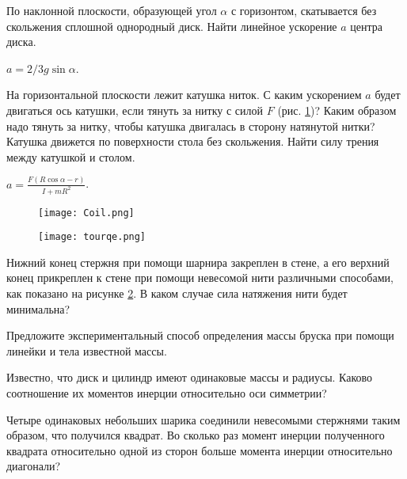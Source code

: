 \begin{ex} %
По наклонной плоскости, образующей угол $\alpha$ с горизонтом, скатывается без скольжения сплошной однородный диск. Найти линейное ускорение $a$ центра диска.
\begin{ans}
$a=2/3g\sin \alpha$.
\end{ans}
\end{ex}	

\begin{ex} %
На горизонтальной плоскости лежит катушка ниток. С каким ускорением $a$ будет двигаться ось катушки, если тянуть за нитку с силой $F$ (рис. \ref{Coil})? Каким образом	надо тянуть за нитку, чтобы катушка двигалась в сторону натянутой нитки? Катушка движется по поверхности стола без скольжения. Найти силу трения между катушкой и столом.
\begin{ans}
$a = \frac{F(R\cos \alpha - r)}{I + mR^2}$.
\end{ans}
\end{ex}	

\begin{figure}
\centering
\texttt{[image: Coil.png]}
\caption{}
\label{Coil}
\end{figure}

\qualProblems

\begin{figure}[h]
\centering
\texttt{[image: tourqe.png]}
\caption{}
\label{tourqe}
\end{figure}

\begin{ex}
Нижний конец стержня при помощи шарнира закреплен в стене, а его верхний конец прикреплен к стене при помощи невесомой нити различными способами, как показано на рисунке \ref{tourqe}. В каком случае сила натяжения нити будет минимальна?
\end{ex}	

\begin{ex}
Предложите экспериментальный способ определения массы бруска при помощи линейки и тела известной массы.
\end{ex}	

\begin{ex}
Известно, что диск и цилиндр имеют одинаковые массы и радиусы. Каково соотношение их моментов инерции относительно оси симметрии?
\end{ex}	

\begin{ex}
Четыре одинаковых небольших шарика соединили невесомыми стержнями таким образом, что получился квадрат. Во сколько раз момент инерции полученного квадрата относительно одной из сторон больше момента инерции относительно диагонали?
\end{ex}	

